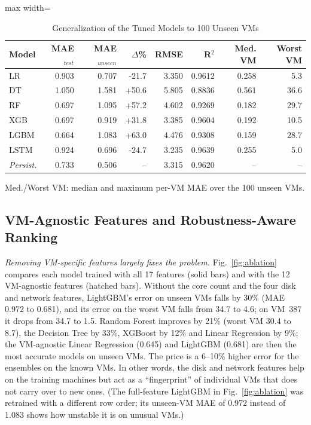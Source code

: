 \documentclass[conference,letterpaper,10pt]{IEEEtran}
\begin{document}
\begin{table}[!htb]
\centering
\caption{Generalization of the Tuned Models to 100 Unseen VMs}
\label{tab:generalization}
\footnotesize
\setlength{\tabcolsep}{4pt}
\begin{adjustbox}{max width=\columnwidth}
\begin{tabular}{lrrrrrrr}
\toprule
Model & MAE$_{test}$ & MAE$_{unseen}$ & $\Delta$\% & RMSE & R$^2$ & Med. VM & Worst VM \\
\midrule
LR & 0.903 & 0.707 & -21.7 & 3.350 & 0.9612 & 0.258 & 5.3 \\
DT & 1.050 & 1.581 & +50.6 & 5.805 & 0.8836 & 0.561 & 36.6 \\
RF & 0.697 & 1.095 & +57.2 & 4.602 & 0.9269 & 0.182 & 29.7 \\
XGB & 0.697 & 0.919 & +31.8 & 3.385 & 0.9604 & 0.192 & 10.5 \\
LGBM & 0.664 & 1.083 & +63.0 & 4.476 & 0.9308 & 0.159 & 28.7 \\
LSTM & 0.924 & 0.696 & -24.7 & 3.235 & 0.9639 & 0.255 & 5.0 \\
\textit{Persist.} & 0.733 & 0.506 & -- & 3.315 & 0.9620 & -- & -- \\
\bottomrule
\end{tabular}
\end{adjustbox}
\par\vspace{3pt}
{\scriptsize Med./Worst VM: median and maximum per-VM MAE over the 100 unseen VMs.\par}
\end{table}

\subsection{VM-Agnostic Features and Robustness-Aware Ranking}
\textit{Removing VM-specific features largely fixes the problem.} Fig.~\ref{fig:ablation} compares each model trained with all 17 features (solid bars) and with the 12 VM-agnostic features (hatched bars). Without the core count and the four disk and network features, LightGBM's error on unseen VMs falls by 30\% (MAE 0.972 to 0.681), and its error on the worst VM falls from 34.7 to 4.6; on VM~387 it drops from 34.7 to 1.5. Random Forest improves by 21\% (worst VM 30.4 to 8.7), the Decision Tree by 33\%, XGBoost by 12\% and Linear Regression by 9\%; the VM-agnostic Linear Regression (0.645) and LightGBM (0.681) are then the most accurate models on unseen VMs. The price is a 6--10\% higher error for the ensembles on the known VMs. In other words, the disk and network features help on the training machines but act as a ``fingerprint'' of individual VMs that does not carry over to new ones. (The full-feature LightGBM in Fig.~\ref{fig:ablation} was retrained with a different row order; its unseen-VM MAE of 0.972 instead of 1.083 shows how unstable it is on unusual VMs.)
\end{document}
